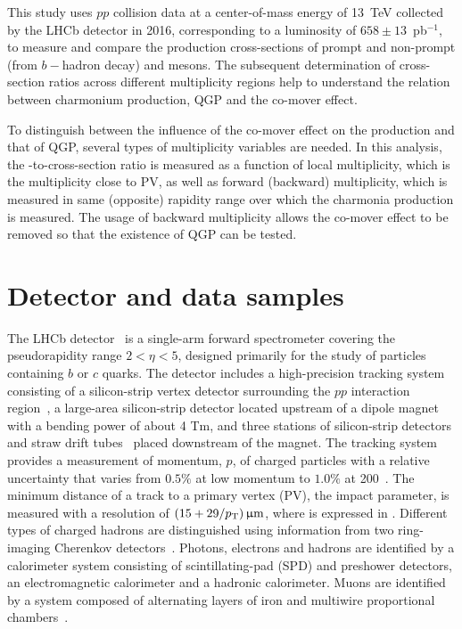 \documentclass[12pt,a4paper]{article}
\begin{document}
This study uses $pp$ collision data at a center-of-mass energy of 13~TeV collected by the LHCb detector in 2016, corresponding to a luminosity of $658\pm13$~pb$^{-1}$, to measure and compare the production cross-sections of prompt and non-prompt (from $b-$hadron decay) \psitwos and \jpsi mesons.  The subsequent determination of cross-section ratios across different multiplicity regions help to understand the relation between charmonium production, QGP and the co-mover effect. 

To distinguish between the influence of the co-mover effect on the production and that of QGP, several types of multiplicity variables are needed. In this analysis, the \psitwos-to-\jpsi cross-section ratio is measured as a function of local multiplicity, which is the multiplicity close to PV, as well as forward (backward) multiplicity, which is measured in same (opposite) rapidity range over which the charmonia production is measured. The usage of backward multiplicity allows the co-mover effect to be removed so that the existence of QGP can be tested. 


\section{Detector and data samples}
\label{Data and Monte Carlo samples}
The LHCb detector~\cite{LHCb-DP-2008-001,LHCb-DP-2014-002} is a single-arm forward spectrometer covering the pseudorapidity range $2 < \eta < 5$, designed primarily for the study of particles containing $b$ or $c$ quarks. The detector includes a high-precision tracking system consisting of a silicon-strip vertex detector surrounding the $pp$ interaction region~\cite{LHCb-DP-2014-001}, a large-area silicon-strip detector located upstream of a dipole magnet with a bending power of about 4 Tm, and three stations of silicon-strip detectors and straw drift tubes~\cite{LHCb-DP-2013-003} placed downstream of the magnet. The tracking system provides a measurement of momentum, $p$, of charged particles with a relative uncertainty that varies from $0.5\%$ at low momentum to $1.0\%$ at 200~\gevc. The minimum distance of a track to a primary vertex (PV), the impact parameter, is measured with a resolution of $(15 + 29/p_{\mathrm{T}})\,\upmu\text{m}$, where \pt is expressed in \gevc. Different types of charged hadrons are distinguished using information from two ring-imaging Cherenkov detectors~\cite{LHCb-DP-2012-003}. Photons, electrons and hadrons are identified by a calorimeter system consisting of scintillating-pad (SPD) and preshower detectors, an electromagnetic calorimeter and a hadronic calorimeter. Muons are identified by a system composed of alternating layers of iron and multiwire proportional chambers~\cite{LHCb-DP-2012-002}.
\end{document}
